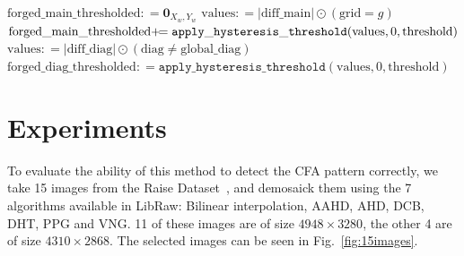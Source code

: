 \documentclass{ipol}
\newcommand{\assign}{:\!=}
\newcommand{\peq}{+\mkern-8mu=}
\begin{document}
\begin{algorithm}[h]
{                
                $\mathrm{forged\_main\_thresholded}  \assign \mathbf 0_{X_w, Y_w}$\;
                {
                        {
                                $\mathrm{values} \assign |\mathrm{diff\_main}|\odot(\mathrm{grid}=g)$\;
                                $\mathrm{forged\_main\_thresholded} \peq \mathtt{apply\_hysteresis\_threshold}(\mathrm{values}, 0, \mathrm{threshold})$\;
                        }
                }
                $\mathrm{values} \assign |\mathrm{diff\_diag}|\odot(\mathrm{diag}\neq\mathrm{global\_diag})$\;
                $\mathrm{forged\_diag\_thresholded} \assign \mathtt{apply\_hysteresis\_threshold}(\mathrm{values}, 0, \mathrm{threshold})$\;
        }
\end{algorithm}


\clearpage




\section{Experiments}
To evaluate the ability of this method to detect the CFA pattern correctly, we take 15 images from the Raise Dataset~\cite{raise}, and demosaick them using the 7 algorithms available in LibRaw: Bilinear interpolation, AAHD, AHD, DCB, DHT, PPG and VNG. 11 of these images are of size $4948\times3280$, the other 4 are of size $4310\times2868$. The selected images can be seen in Fig.~\ref{fig:15images}.
\end{document}
